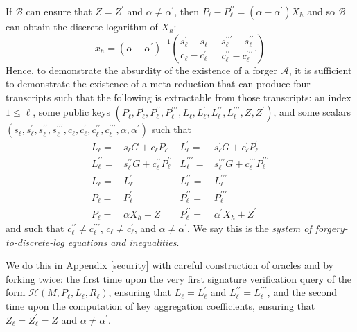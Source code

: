 \documentclass{mrl}
\theoremstyle{definition}
\numberwithin{theorem}{subsection}
\newcommand{\adversary}{\mathcal{A}}
\begin{document}
If $\mathcal{B}$ can ensure that $Z = Z^\prime$ and $\alpha \neq \alpha^\prime$, then $P_\ell - P_\ell^{\prime \prime} = (\alpha - \alpha^\prime)X_h$ and so $\mathcal{B}$ can obtain the discrete logarithm of $X_h$: \[x_h = (\alpha - \alpha^\prime)^{-1}\left(\frac{s_\ell^\prime - s_\ell}{c_\ell - c_\ell^\prime} - \frac{s_\ell^{\prime \prime \prime} - s_\ell^{\prime \prime}}{c_\ell^{\prime \prime} - c_\ell^{\prime \prime \prime}}.\right)\] Hence, to demonstrate the absurdity of the existence of a forger $\adversary$, it is sufficient to demonstrate the existence of a meta-reduction that can produce four transcripts such that the following is extractable from those transcripts: an index $1 \leq \ell$, some public keys $(P_\ell, P_\ell^\prime, P_\ell^{\prime \prime}, P_\ell^{\prime \prime \prime}, L_\ell, L_\ell^\prime, L_\ell^{\prime \prime}, L_\ell^{\prime \prime \prime}, Z, Z^\prime)$, and some scalars $(s_\ell, s_\ell^\prime, s_\ell^{\prime \prime}, s_\ell^{\prime \prime \prime}, c_\ell, c_\ell^\prime, c_\ell^{\prime \prime}, c_\ell^{\prime \prime \prime}, \alpha, \alpha^\prime)$ such that
\begin{align*}
L_\ell = & s_\ell G + c_\ell P_\ell & 
L_{\ell}^\prime =& s_\ell^\prime G + c_\ell^\prime P_\ell^\prime\\
L_\ell^{\prime \prime} =& s_\ell^{\prime \prime} G + c_\ell^{\prime \prime} P_\ell^{\prime \prime} & 
L_{\ell}^{\prime \prime \prime} =& s_\ell^{\prime\prime \prime} G + c_\ell^{\prime \prime \prime} P_\ell^{\prime \prime\prime}\\
L_\ell =& L_\ell^{\prime} & 
L_\ell^{\prime \prime} =& L_\ell^{\prime \prime \prime}\\
P_\ell =& P_\ell^{\prime} & 
P_\ell^{\prime \prime} =& P_\ell^{\prime \prime \prime}\\
P_\ell =& \alpha X_h + Z & 
P_\ell^{\prime \prime} =&  \alpha^\prime X_h + Z^\prime
\end{align*} and such that $c_\ell^{\prime \prime} \neq c_\ell^{\prime \prime \prime}$, $c_\ell \neq c_\ell^\prime$, and $\alpha \neq \alpha^\prime$. We say this is the \textit{system of forgery-to-discrete-log equations and inequalities}.

We do this in Appendix \ref{security} with careful construction of oracles and by forking twice: the first time upon the very first signature verification query of the form $\mathcal{H}(M,P_\ell,L_\ell,R_\ell)$, ensuring that $L_\ell = L_\ell^\prime$ and $L_\ell^{\prime \prime} = L_\ell^{\prime \prime \prime}$, and the second time upon the computation of key aggregation coefficients, ensuring that $Z_\ell = Z_\ell^\prime = Z$ and $\alpha \neq \alpha^\prime$.
\end{document}
